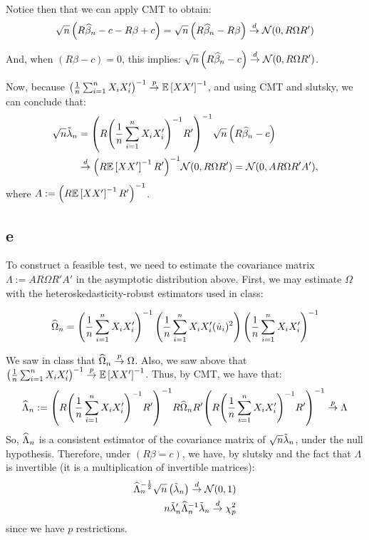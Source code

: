 \documentclass[12pt]{paper}
\begin{document}
Notice then that we can apply CMT to obtain:
\begin{align*}
  \sqrt{n} \left(  R\widehat{ \beta }_{n}-c - R\beta +c\right) =\sqrt{n} \left(  R\widehat{ \beta }_{n} - R\beta \right) \overset{d}{\to} \mathcal{N}( 0, R\Omega R')\\
\end{align*}

And, when $\left(  R \beta - c \right) = 0$, this implies: $\sqrt{n} \left(  R\widehat{ \beta }_{n}-c\right)\overset{d}{\to} \mathcal{N}( 0, R\Omega R')$.

Now, because ${\left( \frac{1}{n} \sum_{i=1}^n X_i X_i'  \right)}^{-1}\overset{p}{\to}\mathbb{E} \left [ XX' \right ]^{-1}$, and using CMT and slutsky, we can conclude that:
\begin{align*}
  \sqrt{n}\tilde{ \lambda }_{n}&={ \left( R { \left( \frac{1}{n} \sum_{i=1}^n X_i
               X_i' \right)}^{-1} R' \right)}^{-1}\sqrt{n} \left(  R \widehat{ \beta }_{n} - c \right)\\
               & \overset{d}{\to} { \left( R\mathbb{E} \left [ XX' \right ]^{-1}R' \right)}^{-1}\mathcal{N}( 0, R\Omega R')=\mathcal{N}( 0,A R\Omega R'A'),\\
\end{align*}
where $A:={ \left( R\mathbb{E} \left [ XX' \right ]^{-1}R' \right)}^{-1}$.

\subsection*{e}

To construct a feasible test, we need to estimate the covariance matrix $\Lambda:=A R\Omega R'A'$ in the asymptotic distribution above. First, we may estimate $\Omega$ with the
heteroskedasticity-robust estimators used in class: 

\begin{equation*}
  \widehat{ \Omega }_{n} = {\left( \frac{1}{n}\sum_{i=1}^n X_i X_i' \right)}^{-1}
  \left( \frac{1}{n}\sum_{i=1}^n X_i X_i' (\hat{u}_i)^2 \right)
  {\left( \frac{1}{n}\sum_{i=1}^n X_i X_i' \right)}^{-1}
\end{equation*}

We saw in class that $\widehat{ \Omega }_{n} \overset{p}{\to} \Omega$. Also, we saw above that  ${\left( \frac{1}{n} \sum_{i=1}^n X_i X_i'  \right)}^{-1}\overset{p}{\to}\mathbb{E} \left [ XX' \right ]^{-1}$. Thus, by CMT, we have that:
\begin{equation*}
  \widehat{ \Lambda }_{n} := { \left( R { \left( \frac{1}{n} \sum_{i=1}^n X_i
               X_i' \right)}^{-1} R' \right)}^{-1}R\widehat{ \Omega }_{n}R'{ \left( R { \left( \frac{1}{n} \sum_{i=1}^n X_i
               X_i' \right)}^{-1} R' \right)}^{-1}\overset{p}{\to} \Lambda
\end{equation*}
So, $\widehat{ \Lambda }_{n}$ is a consistent estimator of the covariance matrix of $\sqrt{n} \tilde{ \lambda }_{n}$, under the null hypothesis. Therefore, under $(R\beta=c)$, we have, by slutsky and the fact that $\Lambda$ is invertible (it is a multiplication of invertible matrices):
\begin{align*}
  \widehat{ \Lambda }_{n}^{-\frac{1}{2}} \sqrt{n} \left(  \tilde{ \lambda }_{n} \right) \overset{d}{\to} \mathcal{N}( 0,
  1 )\\
  n \tilde{ \lambda }_{n}' {\widehat{ \Lambda }_{n}}^{-1} \tilde{ \lambda }_{n}
  \overset{d}{\to} \chi_p^2 \\
\end{align*}
since we have $p$ restrictions.
\end{document}
